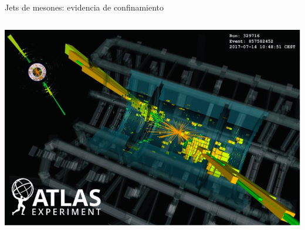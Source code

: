 \documentclass{beamer}
\begin{document}
\begin{frame}{Jets de mesones: evidencia de confinamiento}
\begin{columns}
    \centering
    \includegraphics[width=\linewidth]{figures/atlas_detector.png}
  \end{columns}
\end{frame}
\end{document}

